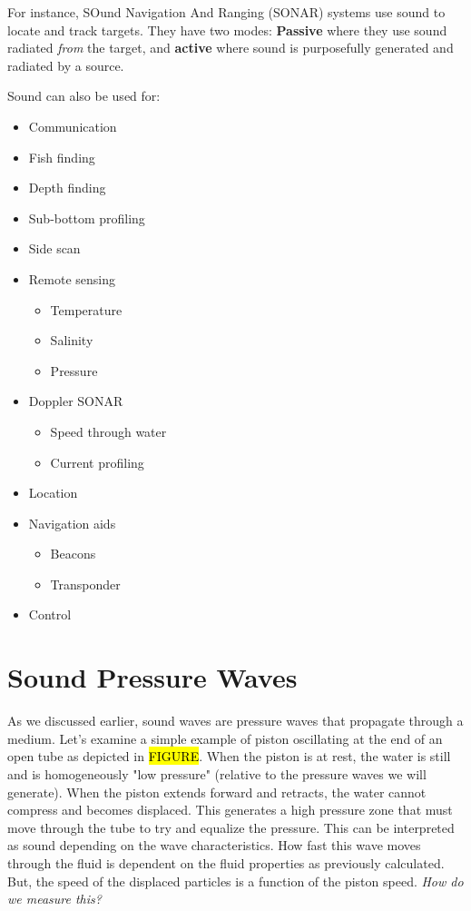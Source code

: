 For instance, SOund Navigation And Ranging (SONAR) systems use sound to locate and track targets.
They have two modes: \textbf{Passive} where they use sound radiated \textit{from} the target, and \textbf{active} where sound is purposefully generated and radiated by a source. 

Sound can also be used for:
\begin{itemize}
    \item Communication
    \item Fish finding
    \item Depth finding
    \item Sub-bottom profiling
    \item Side scan
    \item Remote sensing
        \begin{itemize}
        \item Temperature
        \item Salinity
        \item Pressure
        \end{itemize}
    \item Doppler SONAR
        \begin{itemize}
        \item Speed through water
        \item Current profiling
        \end{itemize}
    \item Location
    \item Navigation aids
        \begin{itemize}
        \item Beacons
        \item Transponder
        \end{itemize}
    \item Control
\end{itemize}

\section{Sound Pressure Waves}
As we discussed earlier, sound waves are pressure waves that propagate through a medium.
Let's examine a simple example of piston oscillating at the end of an open tube as depicted in \hl{FIGURE}.
When the piston is at rest, the water is still and is homogeneously "low pressure" (relative to the pressure waves we will generate).
When the piston extends forward and retracts, the water cannot compress and becomes displaced.
This generates a high pressure zone that must move through the tube to try and equalize the pressure.
This can be interpreted as sound depending on the wave characteristics.
How fast this wave moves through the fluid is dependent on the fluid properties as previously calculated.
But, the speed of the displaced particles is a function of the piston speed.
\emph{How do we measure this?}

